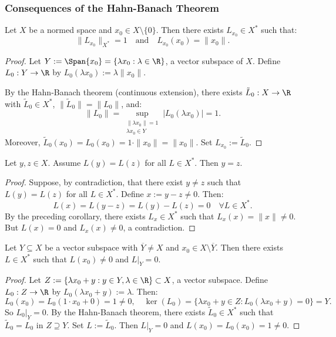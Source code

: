 \subsubsection{Consequences of the Hahn-Banach Theorem}

\begin{corollary}
Let $X$ be a normed space and $x_0 \in X \setminus \{0\}$. Then there exists $L_{x_0} \in X^*$ such that:
\[
\|L_{x_0}\|_{X^*} = 1 \quad \text{and} \quad L_{x_0}(x_0) = \|x_0\|.
\]
\end{corollary}

\begin{proof}
Let $Y := \Span\{x_0\} = \{\lambda x_0 : \lambda \in \R\}$, a vector subspace of $X$. Define $L_0 : Y \to \R$ by $L_0(\lambda x_0) := \lambda \|x_0\|$.

By the Hahn-Banach theorem (continuous extension), there exists $\tilde{L}_0 : X \to \R$ with $\tilde{L}_0 \in X^*$, $\|\tilde{L}_0\| = \|L_0\|$, and:
\[
\|L_0\| = \sup_{\substack{\|\lambda x_0\| = 1 \\ \lambda x_0 \in Y}} |L_0(\lambda x_0)| = 1.
\]
Moreover, $\tilde{L}_0(x_0) = L_0(x_0) = 1 \cdot \|x_0\| = \|x_0\|$. Set $L_{x_0} := \tilde{L}_0$.
\end{proof}

\clearpage
\begin{corollary}
Let $y, z \in X$. Assume $L(y) = L(z)$ for all $L \in X^*$. Then $y = z$.
\end{corollary}

\begin{proof}
Suppose, by contradiction, that there exist $y \neq z$ such that $L(y) = L(z)$ for all $L \in X^*$. Define $x := y - z \neq 0$. Then:
\[
L(x) = L(y - z) = L(y) - L(z) = 0 \quad \forall L \in X^*.
\]
By the preceding corollary, there exists $L_x \in X^*$ such that $L_x(x) = \|x\| \neq 0$. But $L(x) = 0$ and $L_x(x) \neq 0$, a contradiction.
\end{proof}

\begin{corollary}
Let $Y \subseteq X$ be a vector subspace with $\overline{Y} \neq X$ and $x_0 \in X \setminus \overline{Y}$. Then there exists $L \in X^*$ such that $L(x_0) \neq 0$ and $L|_Y = 0$.
\end{corollary}

\begin{proof}
Let $Z := \{\lambda x_0 + y : y \in Y, \lambda \in \R\} \subset X$, a vector subspace. Define $L_0 : Z \to \R$ by $L_0(\lambda x_0 + y) := \lambda$. Then:
\[
L_0(x_0) = L_0(1 \cdot x_0 + 0) = 1 \neq 0, \quad \ker(L_0) = \{\lambda x_0 + y \in Z : L_0(\lambda x_0 + y) = 0\} = Y.
\]
So $L_0|_Y = 0$. By the Hahn-Banach theorem, there exists $\tilde{L}_0 \in X^*$ such that $\tilde{L}_0 = L_0$ in $Z \supseteq Y$. Set $L := \tilde{L}_0$. Then $L|_Y = 0$ and $L(x_0) = L_0(x_0) = 1 \neq 0$.
\end{proof}

